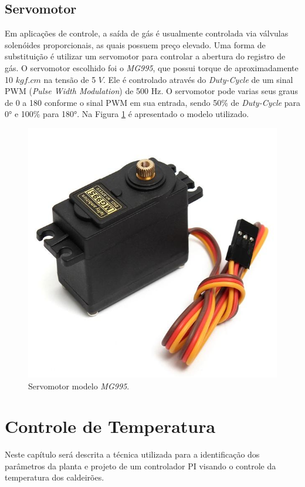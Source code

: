 		\section{Servomotor}
Em aplicações de controle, a saída de gás é usualmente controlada via válvulas solenóides proporcionais, as quais possuem preço elevado. Uma forma de substituição é utilizar um servomotor para controlar a abertura do registro de gás. O servomotor escolhido foi o \textit{MG995}, que possui torque de aproximadamente 10 $kgf.cm$ na tensão de 5 $V$. Ele é controlado através do \textit{Duty-Cycle} de um sinal PWM (\textit{Pulse Width Modulation}) de 500 Hz. O servomotor pode varias seus graus de 0 a 180 conforme o sinal PWM em sua entrada, sendo 50\% de \textit{Duty-Cycle} para 0° e 100\%  para 180°. Na Figura \ref{ServoMotor} é apresentado o modelo utilizado. 
\begin{figure}[htb]
	\caption{\label{ServoMotor}Servomotor modelo \textit{MG995}.}
	\begin{center}
	    \includegraphics[width=0.45\linewidth]{./img/ServoMotor.jpg}
	\end{center}
\end{figure}

	\chapter{Controle de Temperatura}
Neste capítulo será descrita a técnica utilizada para a identificação dos parâmetros da planta e projeto de um controlador PI visando o controle da temperatura dos caldeirões.

